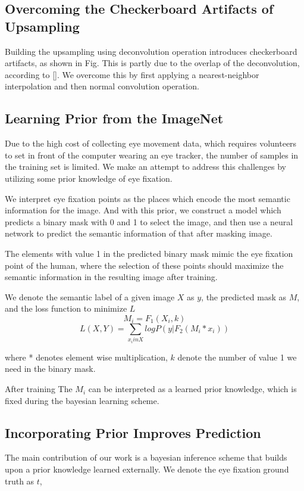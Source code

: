 \documentclass[10pt,twocolumn,letterpaper]{article}
\begin{document}
\subsection{Overcoming the Checkerboard Artifacts of Upsampling}
Building the upsampling using deconvolution operation introduces checkerboard artifacts, as shown in Fig. This is partly due to the overlap of the deconvolution, according to []. We overcome this by first applying a nearest-neighbor interpolation and then normal convolution operation.

\subsection{Learning Prior from the ImageNet}

 Due to the high cost of collecting eye movement data, which requires volunteers to set in front of the computer wearing an eye tracker, the number of samples in the training set is limited. We make an attempt to address this challenges by utilizing some prior knowledge of eye fixation.
 
 We interpret eye fixation points as the places which encode the most semantic information for the image. And with this prior, we construct a model which predicts a binary mask with 0 and 1 to select the image, and then use a neural network to predict the semantic information of that after masking image. 
 
 The elements with value 1 in the predicted binary mask mimic the eye fixation point of the human, where the selection of these points should maximize the semantic information in the resulting image after training.
 
 We denote the semantic label of a given image $X$ as $y$, the predicted mask as $M$, and the loss function to minimize $L$
 $$M_i = F_1(X_i, k)$$
 $$L(X, Y) = \sum_{x_i in X}{logP(y | F_2(M_i * x_i))}$$
 
 where * denotes element wise multiplication, $k$ denote the number of value 1 we need in the binary mask.
 
 After training The $M_i$ can be interpreted as a learned prior knowledge, which is fixed during the bayesian learning scheme.
 
 \subsection{Incorporating Prior Improves Prediction}
 
 The main contribution of our work is a bayesian inference scheme that builds upon a prior knowledge learned externally. We denote the eye fixation ground truth as $t$, 
 
\end{document}
